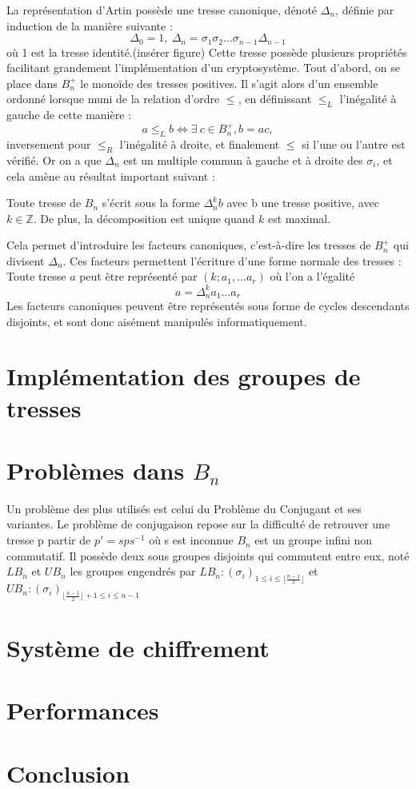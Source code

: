 \documentclass[a4paper,100pt]{article}
\begin{document}
La représentation d'Artin possède une tresse canonique, dénoté $\Delta_n$, définie par induction de la manière suivante :
\[\Delta_0 = 1,\ \Delta_n = \sigma_1\sigma_2\dots\sigma_{n-1}\Delta_{n-1}\] où 1 est la tresse identité.(insérer figure)
Cette tresse possède plusieurs propriétés facilitant grandement l'implémentation d'un cryptosystème. Tout d'abord, on se place dans $B_n^+$ le monoïde des tresses positives. Il s'agit alors d'un ensemble ordonné lorsque muni de la relation d'ordre $\leq$, en définissant $\leq_L$ l'inégalité à gauche de cette manière : \[a \leq_L b \iff \exists \ c \in B_n^+, b = ac,\] inversement pour $\leq_R$ l'inégalité à droite, et finalement $\leq$ si l'une ou l'autre est vérifié.
Or on a que $\Delta_n$ est un multiple commun à gauche et à droite des $\sigma_i$, et cela amène au résultat important suivant :

Toute tresse de $B_n$ s'écrit sous la forme $\Delta_n^{k}b$ avec b une tresse positive, avec $k\in\mathbb{Z}$. De plus, la décomposition est unique quand $k$ est maximal.

Cela permet d'introduire les facteurs canoniques, c'est-à-dire les tresses de $B_n^+$ qui divisent $\Delta_n$. Ces facteurs permettent l'écriture d'une forme normale des tresses : Toute tresse $a$ peut être représenté par $(k;a_1,\dots a_r)$ où l'on a l'égalité \[a = \Delta_n^ka_1\dots a_r\]
Les facteurs canoniques peuvent être représentés sous forme de cycles descendants disjoints, et sont donc aisément manipulés informatiquement.

\section{Implémentation des groupes de tresses}
\section{Problèmes dans $B_n$}
Un problème des plus utilisés est celui du Problème du Conjugant et ses variantes. Le problème de conjugaison repose sur la difficulté de retrouver une tresse p  partir de $p' = sps^{-1}$ où s est inconnue
$B_n$ est un groupe infini non commutatif. Il possède deux sous groupes disjoints qui commutent entre eux, noté $LB_n$ et $UB_n$ les groupes engendrés par \newline \centering$LB_n : (\sigma_i)_{1\le i\le \lfloor {\frac {n-1}{2}}\rfloor}$ et
$UB_n : (\sigma_i)_{\lfloor \frac {n-1}{2}\rfloor + 1 \leq i\leq n-1}$











\raggedright
\section{Système de chiffrement}
\section{Performances}
\section{Conclusion}
\end{document}
